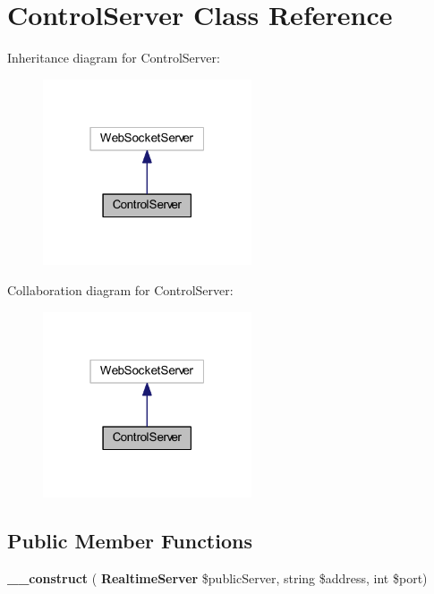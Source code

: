 \section{Control\+Server Class Reference}
\label{class_lora_1_1_control_server}


Inheritance diagram for Control\+Server\+:
\nopagebreak
\begin{figure}[H]
\begin{center}
\leavevmode
\includegraphics[width=175pt]{class_lora_1_1_control_server__inherit__graph}
\end{center}
\end{figure}


Collaboration diagram for Control\+Server\+:
\nopagebreak
\begin{figure}[H]
\begin{center}
\leavevmode
\includegraphics[width=175pt]{class_lora_1_1_control_server__coll__graph}
\end{center}
\end{figure}
\subsection*{Public Member Functions}
\begin{DoxyCompactItemize}
\item 
\mbox{\label{class_lora_1_1_control_server_af1f52d912f7264309f424e05c28b31cb}} 
{\bfseries \+\_\+\+\_\+construct} (\textbf{ Realtime\+Server} \$public\+Server, string \$address, int \$port)
\end{DoxyCompactItemize}

